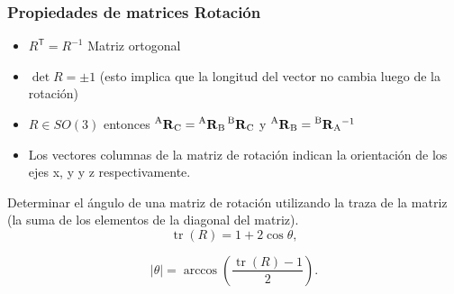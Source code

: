 \begin{frame}
    \frametitle{Propiedades de matrices Rotación}
    \small
    \begin{itemize}
        \item $R^{\mathsf {T}}=R^{-1}$ Matriz ortogonal
        \item $\det R = \pm 1$ (esto implica que la longitud del vector no cambia luego de la rotación)
        \item $R \in SO(3)$ entonces $\prescript{\mathrm{A}}{}{{\boldsymbol{\mathbf{R}}}_\mathrm{C}} = \prescript{\mathrm{A}}{}{{\boldsymbol{\mathbf{R}}}_\mathrm{B}} \prescript{\mathrm{B}}{}{{\boldsymbol{\mathbf{R}}}_\mathrm{C}}$ y $\prescript{\mathrm{A}}{}{{\boldsymbol{\mathbf{R}}}_\mathrm{B}} = \prescript{\mathrm{B}}{}{{\boldsymbol{\mathbf{R}}}_\mathrm{A}}^{-1}$
        \item Los vectores columnas de la matriz de rotación indican la orientación de los ejes x, y y z respectivamente.
    \end{itemize}

    Determinar el ángulo de una matriz de rotación utilizando la traza de la matriz (la suma de los elementos de la diagonal del matriz).
    \begin{equation*}
        {\displaystyle \operatorname {tr} (R)=1+2\cos \theta ,}
    \end{equation*}

    \begin{equation*}
        {\displaystyle |\theta |=\arccos \left({\frac {\operatorname {tr} (R)-1}{2}}\right).}
    \end{equation*}

\end{frame}


